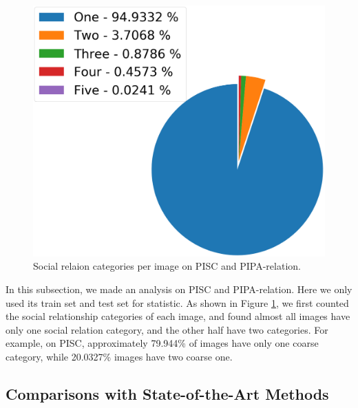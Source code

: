 \documentclass{article}
\begin{document}
\begin{figure}[t]
{    \begin{minipage}[t]{0.45\linewidth}
      \centering
      \includegraphics[width=1\linewidth]{pic/PIPA_fine.png}
    \end{minipage}
  }
  \caption{Social relaion categories per image on PISC and PIPA-relation.}
  \label{fig:dataset_analysis}
\end{figure}


In this subsection, we made an analysis on PISC and PIPA-relation. Here we only used its train set and test set for statistic. As shown in Figure \ref{fig:dataset_analysis}, we first counted the social relationship categories of each image, and found almost all images have only one social relation category, and the other half have two categories. For example, on PISC, approximately 79.944\% of images have only one coarse category, while 20.0327\% images have two coarse one.

\subsection{Comparisons with State-of-the-Art Methods}
\end{document}
